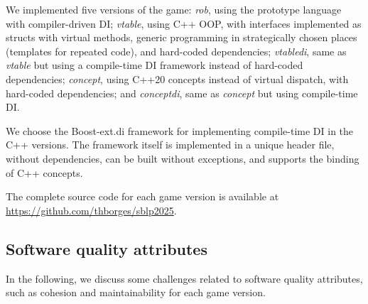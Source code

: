 \documentclass[sigconf]{acmart}
\newcommand{\blindreview}[1]{#1}
\begin{document}
We implemented five versions of the game: \emph{rob}, using the prototype language with compiler-driven DI; \emph{vtable}, using C++ OOP, with interfaces implemented as structs with virtual methods, generic programming in strategically chosen places (templates for repeated code), and hard-coded dependencies; \emph{vtabledi}, same as \emph{vtable} but using a compile-time DI framework \cite{boostdi2018} instead of hard-coded dependencies; \emph{concept}, using C++20 concepts instead of virtual dispatch, with hard-coded dependencies; and \emph{conceptdi}, same as \emph{concept} but using compile-time DI.

We choose the Boost-ext.di framework \cite{boostdi2018} for implementing compile-time DI in the C++ versions. The framework itself is implemented in a unique header file, without dependencies, can be built without exceptions, and supports the binding of C++ concepts.

The complete source code for each game version is available at \blindreview{\url{https://github.com/thborges/sblp2025}}.

\subsection{Software quality attributes} \label{sec:softwarequality}

In the following, we discuss some challenges related to software quality attributes, such as cohesion and maintainability for each game version. 
\end{document}
